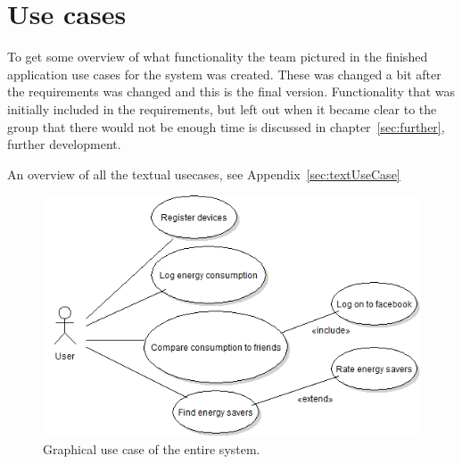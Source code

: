 \section{Use cases}
To get some overview of what functionality the team pictured in the finished application use cases for the system was created. These was changed a bit after the requirements was changed and this is the final version. Functionality that was initially included in the requirements, but left out when it became clear to the group that there would not be enough time is discussed in chapter~\ref{sec:further}, further development.


An overview of all the textual usecases, see Appendix~\ref{sec:textUseCase}


\begin{figure}[H]
\includegraphics[width=\textwidth]{ch/specification/fig/currentUsecase.PNG}
\caption{Graphical use case of the entire system.}
\label{fig:usecase}
\end{figure}
